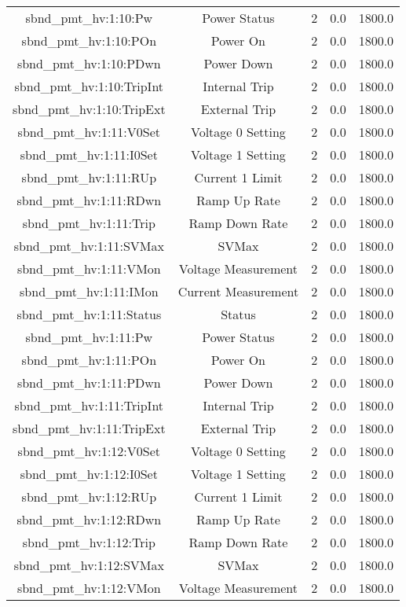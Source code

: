 \begin{table}[ptb]
\begin{tabular}{c | c c c c}
sbnd_pmt_hv:1:10:Pw & Power Status & 2 & 0.0 & 1800.0\\ 
sbnd_pmt_hv:1:10:POn & Power On & 2 & 0.0 & 1800.0\\ 
sbnd_pmt_hv:1:10:PDwn & Power Down & 2 & 0.0 & 1800.0\\ 
sbnd_pmt_hv:1:10:TripInt & Internal Trip & 2 & 0.0 & 1800.0\\ 
sbnd_pmt_hv:1:10:TripExt & External Trip & 2 & 0.0 & 1800.0\\ 
sbnd_pmt_hv:1:11:V0Set & Voltage 0 Setting & 2 & 0.0 & 1800.0\\ 
sbnd_pmt_hv:1:11:I0Set & Voltage 1 Setting & 2 & 0.0 & 1800.0\\ 
sbnd_pmt_hv:1:11:RUp & Current 1 Limit & 2 & 0.0 & 1800.0\\ 
sbnd_pmt_hv:1:11:RDwn & Ramp Up Rate & 2 & 0.0 & 1800.0\\ 
sbnd_pmt_hv:1:11:Trip & Ramp Down Rate & 2 & 0.0 & 1800.0\\ 
sbnd_pmt_hv:1:11:SVMax & SVMax & 2 & 0.0 & 1800.0\\ 
sbnd_pmt_hv:1:11:VMon & Voltage Measurement & 2 & 0.0 & 1800.0\\ 
sbnd_pmt_hv:1:11:IMon & Current Measurement & 2 & 0.0 & 1800.0\\ 
sbnd_pmt_hv:1:11:Status & Status & 2 & 0.0 & 1800.0\\ 
sbnd_pmt_hv:1:11:Pw & Power Status & 2 & 0.0 & 1800.0\\ 
sbnd_pmt_hv:1:11:POn & Power On & 2 & 0.0 & 1800.0\\ 
sbnd_pmt_hv:1:11:PDwn & Power Down & 2 & 0.0 & 1800.0\\ 
sbnd_pmt_hv:1:11:TripInt & Internal Trip & 2 & 0.0 & 1800.0\\ 
sbnd_pmt_hv:1:11:TripExt & External Trip & 2 & 0.0 & 1800.0\\ 
sbnd_pmt_hv:1:12:V0Set & Voltage 0 Setting & 2 & 0.0 & 1800.0\\ 
sbnd_pmt_hv:1:12:I0Set & Voltage 1 Setting & 2 & 0.0 & 1800.0\\ 
sbnd_pmt_hv:1:12:RUp & Current 1 Limit & 2 & 0.0 & 1800.0\\ 
sbnd_pmt_hv:1:12:RDwn & Ramp Up Rate & 2 & 0.0 & 1800.0\\ 
sbnd_pmt_hv:1:12:Trip & Ramp Down Rate & 2 & 0.0 & 1800.0\\ 
sbnd_pmt_hv:1:12:SVMax & SVMax & 2 & 0.0 & 1800.0\\ 
sbnd_pmt_hv:1:12:VMon & Voltage Measurement & 2 & 0.0 & 1800.0\\ 

\end{tabular}
\end{table}
